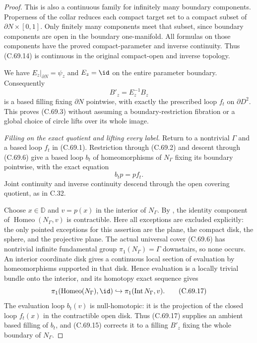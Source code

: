 \begin{proof}
This is also a continuous
family for infinitely many
boundary components.
Properness of the collar
reduces each compact target
set to a compact subset
of $\partial N\times[0,1]$.
Only finitely many components
meet that subset, since
boundary components are
open in the boundary
one-manifold. All formulas
on those components have
the proved compact-parameter
and inverse continuity.
Thus (C.69.14) is continuous
in the original compact-open
and inverse topology.

We have
$E_z|_{\partial N}=\psi_z$
and $E_z=\id$ on the entire
parameter boundary. Consequently
\[
                            B'_z=E_z^{-1}B_z
                                                               \tag{C.69.15}
\]
is a based filling fixing
$\partial N$ pointwise,
with exactly the prescribed
loop $f_t$ on $\partial D^2$.
This proves (C.69.3) without
assuming a boundary-restriction
fibration or a global choice
of circle lifts over its
whole image.

\emph{Filling on the exact quotient and lifting every label.}
Return to a nontrivial
$\Gamma$ and a based loop
$f_t$ in (C.69.1).
Restriction through (C.69.2)
and descent through (C.69.6)
give a based loop $b_t$
of homeomorphisms of
$N_\Gamma$ fixing its
boundary pointwise, with
the exact equation
\[
                            b_t p=p f_t .
                                                               \tag{C.69.16}
\]
Joint continuity and inverse
continuity descend through
the open covering quotient,
as in C.32.

Choose $x\in\mathbb D$ and
$v=p(x)$ in the interior
of $N_\Gamma$.
By \cite[Theorem~1.1 and
Lemma~2.1]{C_Yagasaki2000},
the identity component of
$\operatorname{Homeo}(N_\Gamma,v)$
is contractible.
Here all exceptions are
excluded explicitly:
the only pointed exceptions
for this assertion are the
plane, the compact disk,
the sphere, and the projective
plane. The actual universal
cover (C.69.6) has nontrivial
infinite fundamental group
$\pi_1(N_\Gamma)=\Gamma$
downstairs, so none occurs.
An interior coordinate disk
gives a continuous local
section of evaluation by
homeomorphisms supported in
that disk. Hence evaluation
is a locally trivial bundle
onto the interior, and its
homotopy exact sequence gives
\[
 \pi_1(\operatorname{Homeo}(N_\Gamma),\id)
             \hookrightarrow\pi_1(\operatorname{Int}N_\Gamma,v).
                                                               \tag{C.69.17}
\]
The evaluation loop $b_t(v)$
is null-homotopic: it is
the projection of the closed
loop $f_t(x)$ in the
contractible open disk.
Thus (C.69.17) supplies an
ambient based filling of
$b_t$, and (C.69.15)
corrects it to a filling
$B'_z$ fixing the whole
boundary of $N_\Gamma$.


\end{proof}
